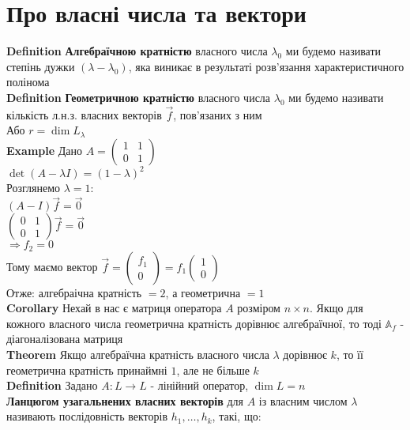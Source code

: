 \documentclass[a4paper, 10pt]{article}
\def\defin#1{\textbf{Definition {#1}}}
\def\ex#1{\textbf{Example {#1}}}
\def\th#1{\textbf{Theorem {#1}}}
\def\crl#1{\textbf{Corollary {#1}}}
\theoremstyle{theoremdd}
\theoremstyle{theoremdd}
\theoremstyle{theoremdd}
\theoremstyle{theoremdd}
\theoremstyle{theoremdd}
\theoremstyle{theoremdd}
\theoremstyle{theoremdd}
\theoremstyle{theoremdd}
\begin{document}
\section*{Про власні числа та вектори}
\defin{} \textbf{Алгебраїчною кратністю} власного числа $\lambda_0$ ми будемо називати степінь дужки $(\lambda - \lambda_0)$, яка виникає в результаті розв'язання характеристичного полінома
\bigskip \\
\defin{} \textbf{Геометричною кратністю} власного числа $\lambda_0$ ми будемо називати кількість л.н.з. власних векторів $\vec{f}$, пов'язаних з ним\\
Або $r = \dim L_{\lambda}$
\bigskip \\
\ex{} Дано $A = \begin{pmatrix}
1 & 1 \\
0 & 1
\end{pmatrix}$\\
$\det(A-\lambda I) = (1-\lambda)^2$\\
Розглянемо $\lambda = 1$:\\
$(A-I)\vec{f} = \vec{0}$\\
$\begin{pmatrix}
0 & 1 \\
0 & 1
\end{pmatrix} \vec{f} = \vec{0}$\\
$\Rightarrow f_2 = 0$\\
Тому маємо вектор $\vec{f} = \begin{pmatrix}
f_1 \\ 0
\end{pmatrix} = f_1 \begin{pmatrix}
1 \\ 0
\end{pmatrix}$\\
Отже: алгебраічна кратність $= 2$, а геометрична $= 1$
\bigskip \\
\crl{} Нехай в нас є матриця оператора $A$ розміром $n \times n$. Якщо для кожного власного числа геометрична кратність дорівнює алгебраїчної, то тоді $\mathbb{A}_f$ - діагоналізована матриця
\bigskip \\
\th{} Якщо алгебраїчна кратність власного числа $\lambda$ дорівнює $k$, то її геометрична кратність принаймні $1$, але не більше $k$
\bigskip \\
\defin{} Задано $A: L \to L$ - лінійний оператор, $\dim L = n$\\
\textbf{Ланцюгом узагальнених власних векторів} для $A$ із власним числом $\lambda$ називають послідовність векторів $h_1, \dots, h_k$, такі, що:\\
\end{document}
